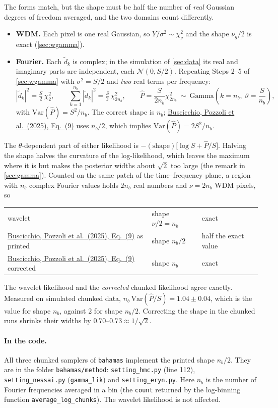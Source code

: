 \documentclass[11pt,a4paper]{article}
\newcommand{\urlPone}{https://arxiv.org/pdf/2511.03604}
\newcommand{\PoneEq}[1]{\href{\urlPone}{Buscicchio, Pozzoli et al.~(2025), Eq.~(#1)}}
\newcommand{\Pbar}{\hat{P}}
\begin{document}
The forms match, but the shape must be half the number of \emph{real} Gaussian
degrees of freedom averaged, and the two domains count differently.
\begin{itemize}
  \item \textbf{WDM.} Each pixel is one real Gaussian, so $Y/\sigma^2\sim\chi^2_\nu$ and
        the shape $\nu_g/2$ is exact (\cref{sec:wgamma}).
  \item \textbf{Fourier.} Each $\tilde d_k$ is complex; in the simulation of
        \cref{sec:data} its real and imaginary parts are independent, each
        $\mathcal N(0,S/2)$. Repeating Steps 2--5 of \cref{sec:wgamma} with
        $\sigma^2=S/2$ and \emph{two} real terms per frequency:
        \[
          |\tilde d_k|^2 = \tfrac S2\,\chi^2_2,\qquad
          \sum_{k=1}^{n_b}|\tilde d_k|^2 = \tfrac S2\,\chi^2_{2n_b},\qquad
          \Pbar = \frac{S}{2n_b}\chi^2_{2n_b}\ \sim\ \mathrm{Gamma}\!\left(k=n_b,\ \vartheta=\frac{S}{n_b}\right),
        \]
        with $\mathrm{Var}(\Pbar)=S^2/n_b$. The correct shape is $n_b$; \PoneEq{9} uses
        $n_b/2$, which implies $\mathrm{Var}(\Pbar)=2S^2/n_b$.
\end{itemize}
The $\theta$-dependent part of either likelihood is
$-(\text{shape})\big[\log S+\Pbar/S\big]$. Halving the shape halves the curvature of
the log-likelihood, which leaves the maximum where it is but makes the posterior widths
about $\sqrt2$ too large (the remark in \cref{sec:gamma}). Counted on the same patch of
the time--frequency plane, a region with $n_b$ complex Fourier values holds $2n_b$ real
numbers and $\nu=2n_b$ WDM pixels, so
\begin{center}
\begin{tabular}{@{}lll@{}}
wavelet & shape $\nu/2 = n_b$ & exact \\
\PoneEq{9} as printed & shape $n_b/2$ & half the exact value \\
\PoneEq{9} corrected & shape $n_b$ & exact \\
\end{tabular}
\end{center}
The wavelet likelihood and the \emph{corrected} chunked likelihood agree exactly.
Measured on simulated chunked data, $n_b\,\mathrm{Var}(\Pbar/S)=1.04\pm0.04$, which is
the value for shape $n_b$, against 2 for shape $n_b/2$. Correcting the shape in the
chunked runs shrinks their widths by $0.70$--$0.73\approx1/\sqrt2$.

\paragraph{In the code.} All three chunked samplers of \texttt{bahamas} implement the
printed shape $n_b/2$. They are in the folder \texttt{bahamas/method}:
\texttt{setting\_hmc.py} (line 112), \texttt{setting\_nessai.py}
(\texttt{gamma\_lik}) and \texttt{setting\_eryn.py}. Here
$n_b$ is the number of Fourier frequencies averaged in a bin (the \texttt{count}
returned by the log-binning function \texttt{average\_log\_chunks}). The wavelet
likelihood is not affected.
\end{document}
